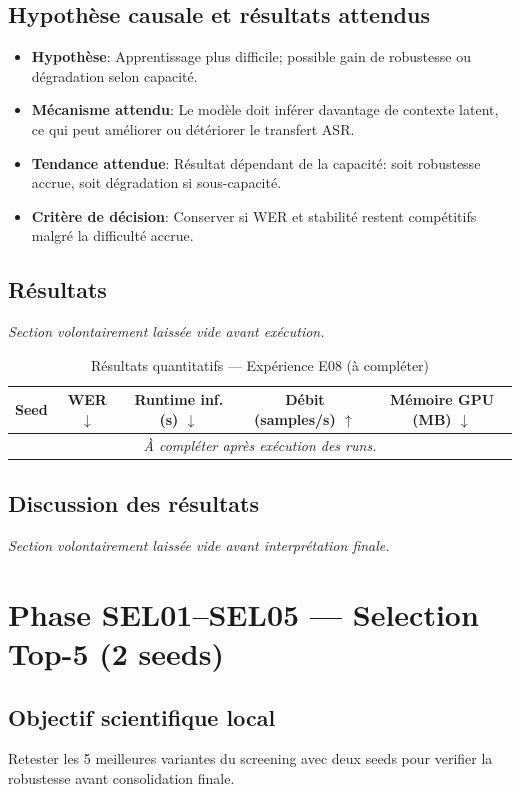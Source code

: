 \documentclass[11pt,a4paper]{article}
\begin{document}
\subsection{Hypothèse causale et résultats attendus}
\begin{itemize}[leftmargin=1.2cm]
\item \textbf{Hypothèse}: Apprentissage plus difficile; possible gain de robustesse ou dégradation selon capacité.
\item \textbf{Mécanisme attendu}: Le modèle doit inférer davantage de contexte latent, ce qui peut améliorer ou détériorer le transfert ASR.
\item \textbf{Tendance attendue}: Résultat dépendant de la capacité: soit robustesse accrue, soit dégradation si sous-capacité.
\item \textbf{Critère de décision}: Conserver si WER et stabilité restent compétitifs malgré la difficulté accrue.
\end{itemize}

\subsection{Résultats}
\textit{Section volontairement laissée vide avant exécution.}

\begin{table}[H]
\centering
\caption{Résultats quantitatifs --- Expérience E08 (à compléter)}
\begin{tabular}{lcccc}
\toprule
Seed & WER $\downarrow$ & Runtime inf. (s) $\downarrow$ & Débit (samples/s) $\uparrow$ & Mémoire GPU (MB) $\downarrow$ \\
\midrule
\multicolumn{5}{c}{\textit{À compléter après exécution des runs.}} \\
\bottomrule
\end{tabular}
\end{table}

\subsection{Discussion des résultats}
\textit{Section volontairement laissée vide avant interprétation finale.}


\section{Phase SEL01--SEL05 --- Selection Top-5 (2 seeds)}
\subsection{Objectif scientifique local}
Retester les 5 meilleures variantes du screening avec deux seeds pour verifier la robustesse avant consolidation finale.
\end{document}
